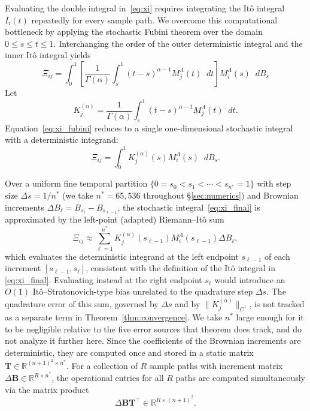 \documentclass[11pt, a4paper]{article}
\theoremstyle{theoremstyle}
\theoremstyle{definitionstyle}
\newcommand{\dd}{\mathop{}\!d}
\begin{document}
Evaluating the double integral in~\eqref{eq:xi} requires integrating the It\^o integral $I_i(t)$ repeatedly for every sample path. We overcome this computational bottleneck by applying the stochastic Fubini theorem \cite{veraar2012stochastic} over the domain $0 \leq s \leq t \leq 1$. Interchanging the order of the outer deterministic integral and the inner It\^o integral yields
\begin{equation}\label{eq:xi_fubini}
    \Xi_{ij} = \int_0^1 \left [ \frac 1{\Gamma(\alpha)} \int_s^1 (t - s)^{\alpha - 1}M_j^\Lambda(t)\dd{t} \right ] M_i^\Lambda(s)\dd{B_s}
\end{equation}
Let
\begin{equation}
    K^{(\alpha)}_j = \frac 1{\Gamma(\alpha)} \int_s^1 (t - s)^{\alpha - 1}M_j^\Lambda(t)\dd{t}.
\end{equation}
Equation~\eqref{eq:xi_fubini} reduces to a single one-dimensional stochastic integral with a deterministic integrand:
\begin{equation}\label{eq:xi_final}
    \Xi_{ij} = \int_0^1 K^{(\alpha)}_j(s)M_i^\Lambda(s)\dd{B_s}.
\end{equation}

Over a uniform fine temporal partition $\{0 = s_0 < s_1 < \cdots < s_{n^*} = 1\}$ with step size $\Delta s = 1/n^*$ (we take $n^* = 65{,}536$ throughout \S\ref{sec:numerics}) and Brownian increments $\Delta B_\ell = B_{s_\ell} - B_{s_{\ell-1}}$, the stochastic integral~\eqref{eq:xi_final} is approximated by the left-point (adapted) Riemann--Itô sum
\begin{equation}
    \Xi_{ij} \approx \sum_{\ell=1}^{n^*} K_j^{(\alpha)}(s_{\ell-1})M_i^\Lambda(s_{\ell-1})\Delta B_\ell,
\end{equation}
which evaluates the deterministic integrand at the left endpoint $s_{\ell-1}$ of each increment $[s_{\ell-1},s_\ell]$, consistent with the definition of the It\^o integral in \eqref{eq:xi_final}. Evaluating instead at the right endpoint $s_\ell$ would introduce an $O(1)$ It\^o--Stratonovich-type bias unrelated to the quadrature step $\Delta s$. The quadrature error of this sum, governed by $\Delta s$ and by $\|K_j^{(\alpha)}\|_{C^1}$, is not tracked as a separate term in Theorem~\ref{thm:convergence}. We take $n^*$ large enough for it to be negligible relative to the five error sources that theorem does track, and do not analyze it further here. Since the coefficients of the Brownian increments are deterministic, they are computed once and stored in a static matrix $\mathbf T \in \mathbb R^{(n+1)^2 \times n^*}$. For a collection of $R$ sample paths with increment matrix $\Delta \mathbf B \in \mathbb R^{R \times n^*}$, the operational entries for all $R$ paths are computed simultaneously via the matrix product
\begin{equation}
    \Delta \mathbf B \mathbf T^\top \in \mathbb R^{R \times (n+1)^2}.
\end{equation}
\end{document}
